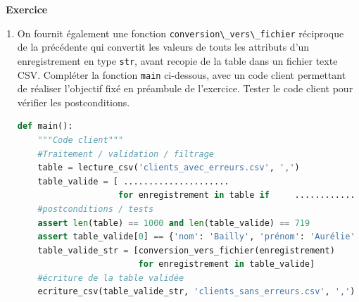 \documentclass[
  11pt,
]{article}
\newcommand{\passthrough}[1]{#1}
\newcounter{exo}
\newenvironment{exercice}[1]
{\par \medskip   \addtocounter{exo}{1} \noindent  
\begin{bclogo}[arrondi =0.1,   noborder = true, logo=\bccrayon, marge=4]{~\textbf{Exercice} \textbf{\theexo} {\itshape #1} }  \par}
{
\end{bclogo}
 \par \bigskip }
\newcounter{def}
\begin{document}
\begin{exercice}{}
\begin{enumerate}
\begin{lstlisting}[language=Python]
def conversion_vers_table(enregistrement):
    return { 'nom' : enregistrement['nom'],
            'prénom'  : enregistrement['prénom'],
            'email' : enregistrement['email'],
            'département' : enregistrement['département'],
            'naissance' : enregistrement['naissance'],
            'visites' : ............................... ,
            'dépenses' : ...............................
            }
\end{lstlisting}
\item
  On fournit également une fonction
  \passthrough{\lstinline!conversion\_vers\_fichier!} réciproque de la
  précédente qui convertit les valeurs de touts les attributs d'un
  enregistrement en type \passthrough{\lstinline!str!}, avant recopie de
  la table dans un fichier texte CSV. Compléter la fonction
  \passthrough{\lstinline!main!} ci-dessous, avec un code client
  permettant de réaliser l'objectif fixé en préambule de l'exercice.
  Tester le code client pour vérifier les postconditions.

\begin{lstlisting}[language=Python]
def main():
    """Code client"""
    #Traitement / validation / filtrage
    table = lecture_csv('clients_avec_erreurs.csv', ',')
    table_valide = [ .....................
                    for enregistrement in table if     .................        ]
    #postconditions / tests
    assert len(table) == 1000 and len(table_valide) == 719
    assert table_valide[0] == {'nom': 'Bailly', 'prénom': 'Aurélie', 'email': 'abailly1@gmail.com', 'département': '22', 'naissance': '1986-09-22', 'visites': 79, 'dépenses': 4389.47}
    table_valide_str = [conversion_vers_fichier(enregistrement)
                        for enregistrement in table_valide]
    #écriture de la table validée
    ecriture_csv(table_valide_str, 'clients_sans_erreurs.csv', ',')
\end{lstlisting}
\end{enumerate}

\end{exercice}
\end{document}

